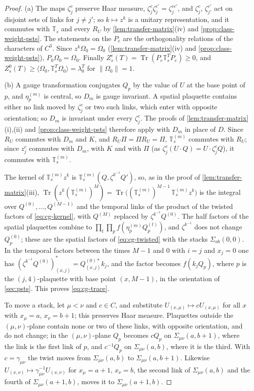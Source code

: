 \documentclass[11pt,a4paper]{amsart}
\theoremstyle{definition}
\theoremstyle{remark}
\numberwithin{equation}{section}
\DeclareMathOperator{\Tr}{Tr}        %
\newcommand{\ip}[2]{\langle #1,#2\rangle}  %
\newcommand{\norm}[1]{\lVert #1\rVert}     %
\newcommand{\TT}{\mathbb{T}}               %
\newcommand{\lzero}{\lambda_0}             %
\newcommand{\Omegazero}{\Omega_0}          %
\begin{document}
\begin{proof}
(a) The maps $\zeta_j^c$ preserve Haar measure, $\zeta_j^c\zeta_j^{c'}=\zeta_j^{cc'}$, and $\zeta_j^c$, $\zeta_{j'}^{c'}$ act on disjoint sets of links for $j\ne j'$; so $k\mapsto z^k$ is a unitary representation, and it commutes with $\TT_s$ and every $R_U$ by \cref{lem:transfer-matrix}\textup{(iv)} and \cref{prop:class-weight-psts}. The statements on the $P_e$ are the orthogonality relations of the characters of $C^3$. Since $z^k\Omegazero=\Omegazero$ (\cref{lem:transfer-matrix}\textup{(iv)} and \cref{prop:class-weight-psts}), $P_0\Omegazero=\Omegazero$. Finally $Z^e_s(T)=\Tr(P_e\TT_s^TP_e)\ge0$, and $Z^0_s(T)\ge\ip{\Omegazero}{\TT_s^T\Omegazero}=\lzero^T$ for $\norm{\Omegazero}=1$.

(b) A gauge transformation conjugates $Q_p$ by the value of $U$ at the base point of $p$, and $\eta^{(m)}_p$ is central, so $D_m$ is gauge invariant. A spatial plaquette contains either no link moved by $\zeta_j^c$ or two such links, which enter with opposite orientation; so $D_m$ is invariant under every $\zeta_j^c$. The proofs of \cref{lem:transfer-matrix}\textup{(i),(ii)} and \cref{prop:class-weight-psts} therefore apply with $D_m$ in place of $D$. Since $R_U$ commutes with $D_m$ and $K$, and $R_U\Pi=\Pi R_U=\Pi$, $\TT^{(m)}_s$ commutes with $R_U$; since $z_j^c$ commutes with $D_m$, with $K$ and with $\Pi$ (as $\zeta_j^c(U\cdot Q)=U\cdot\zeta_j^cQ$), it commutes with $\TT^{(m)}_s$.

The kernel of $\TT^{(m)}_sz^k$ is $\TT^{(m)}_s(Q,\zeta^{k^{-1}}Q')$, so, as in the proof of \cref{lem:transfer-matrix}\textup{(iii)}, $\Tr(z^k(\TT^{(m)}_s)^M)=\Tr\bigl((\TT^{(m)}_s)^{M-1}\,\TT^{(m)}_sz^k\bigr)$ is the integral over $Q^{(0)},\dots,Q^{(M-1)}$ and the temporal links of the product of the twisted factors of \eqref{eq:cg-kernel}, with $Q^{(M)}$ replaced by $\zeta^{k^{-1}}Q^{(0)}$. The half factors of the spatial plaquettes combine to $\prod_t\prod_pf(\eta^{(m)}_pQ^{(t)}_p)$, and $\zeta^{k^{-1}}$ does not change $Q^{(0)}_p$; these are the spatial factors of \eqref{eq:cg-twisted} with the stacks $\Sigma_{ab}(0,0)$. In the temporal factors between the times $M-1$ and $0$ with $i=j$ and $x_j=0$ one has $(\zeta^{k^{-1}}Q^{(0)})^*_{(x,j)}=Q^{(0)*}_{(x,j)}k_j$, and the factor becomes $f(k_jQ_p)$, where $p$ is the $(j,4)$-plaquette with base point $(x,M-1)$, in the orientation of \cref{sec:psts}. This proves \eqref{eq:cg-trace}.

To move a stack, let $\mu<\nu$ and $c\in C$, and substitute $U_{(x,\mu)}\mapsto cU_{(x,\mu)}$ for all $x$ with $x_\mu=a$, $x_\nu=b+1$; this preserves Haar measure. Plaquettes outside the $(\mu,\nu)$-plane contain none or two of these links, with opposite orientation, and do not change; in the $(\mu,\nu)$-plane $Q_p$ becomes $cQ_p$ on $\Sigma_{\mu\nu}(a,b+1)$, where the link is the first link of $p$, and $c^{-1}Q_p$ on $\Sigma_{\mu\nu}(a,b)$, where it is the third. With $c=\gamma_{\mu\nu}$ the twist moves from $\Sigma_{\mu\nu}(a,b)$ to $\Sigma_{\mu\nu}(a,b+1)$. Likewise $U_{(x,\nu)}\mapsto\gamma_{\mu\nu}^{-1}U_{(x,\nu)}$ for $x_\mu=a+1$, $x_\nu=b$, the second link of $\Sigma_{\mu\nu}(a,b)$ and the fourth of $\Sigma_{\mu\nu}(a+1,b)$, moves it to $\Sigma_{\mu\nu}(a+1,b)$.


\end{proof}
\end{document}
